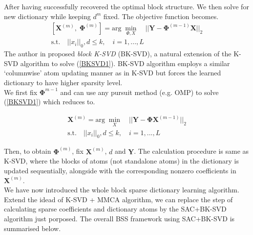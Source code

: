 After having successfully recovered the optimal block structure. We then solve for new dictionary while keeping $d^{m}$ fixed. The objective function becomes.
\begin{equation}
\begin{aligned}
    \left[\mathbf{X}^{(m)}, \;\mathbf{\Phi}^{(m)}\right] = \text{arg} \; \min_{\Phi,X} \quad || \mathbf{Y} - \mathbf{\Phi}^{(m-1)}\mathbf{X}||_2 \\
    \text{s.t.} \quad ||x_i||_0,d \leq k, \quad i = 1,...,L
\end{aligned}
\label{BKSVD1}
\end{equation}
The author in \cite{dictionary_block_sparse} proposed \textit{block K-SVD} (BK-SVD), a natural extension of the K-SVD algorithm to solve (\ref{BKSVD1}). BK-SVD algorithm employs a similar `columnwise' atom updating manner as in K-SVD but forces the learned dictionary to have higher sparsity level.\\

We first fix $\mathbf{\Phi}^{m-1}$ and can use any pursuit method (e.g. OMP) to solve (\ref{BKSVD1}) which reduces to.

\begin{equation}
\begin{aligned}
    \mathbf{X}^{(m)} = \text{arg} \; \min_X \quad || \mathbf{Y} - \mathbf{\Phi}\mathbf{X}^{(m-1)}||_2 \\
    \text{s.t.} \quad ||x_i||_0,d \leq k, \quad i = 1,...,L
\end{aligned}
\end{equation}

Then, to obtain $\mathbf{\Phi}^{(m)}$, fix $\mathbf{X}^{(m)}$, $d$ and $\mathbf{Y}$. The calculation procedure is same as K-SVD, where the blocks of atoms (not standalone atoms) in the dictionary is updated sequentially, alongside with the corresponding nonzero coefficients in $\mathbf{X}^{(m)}$.\\

We have now introduced the whole block sparse dictionary learning algorithm. Extend the idead of K-SVD + MMCA algorithm, we can replace the step of calculating sparse coefficients and dictionary atoms by the SAC+BK-SVD algorithm just porposed. The overall BSS framework using SAC+BK-SVD is summarised below.


